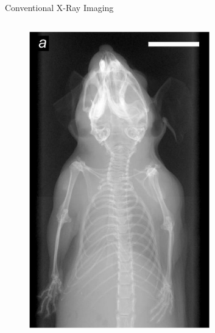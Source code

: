 \documentclass[
 ]{beamer}%
\begin{document}
\begin{frame}{Conventional X-Ray Imaging}
\begin{columns}
        \begin{column}{.28\textwidth}
            \begin{figure}[ht]
                \centering
                \includegraphics[width=0.7\textwidth]{images/XRay_Attenuation_Contrast.jpg}

                \scriptsize\cite{Bech2013}
                \label{fig:attenuation_contrast}
            \end{figure}
        \end{column}
    \end{columns}
\end{frame}
\end{document}
